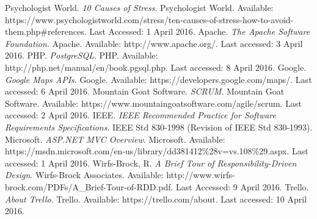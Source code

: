 \documentclass[10pt,twocolumn]{witseiepaper}
\begin{document}
\begin{thebibliography}{1}
	 Psychologist World. \textit{10 Causes of Stress}. Psychologist World. Available: https://www.psychologistworld.com/stress/ten-causes-of-stress-how-to-avoid-them.php\#references. Last Accessed: 1 April 2016. 
	 Apache. \textit{The Apache Software Foundation}. Apache. Available: http://www.apache.org/. Last accessed: 3 April 2016.
	 PHP. \textit{PostgreSQL}. PHP. Available: http://php.net/manual/en/book.pgsql.php. Last accessed: 8 April 2016.
	 Google. \textit{Google Maps APIs}. Google. Available: https://developers.google.com/maps/. Last accessed: 6 April 2016.
	 Mountain Goat Software. \textit{SCRUM}. Mountain Goat Software. Available: https://www.mountaingoatsoftware.com/agile/scrum. Last accessed: 2 April 2016.
	 IEEE. \textit{IEEE Recommended Practice for Software Requirements Specifications}. IEEE Std 830-1998 (Revision of IEEE Std 830-1993).
	 Microsoft. \textit{ASP.NET MVC Overview}. Microsoft. Available: https://msdn.microsoft.com/en-us/library/dd381412\%28v=vs.108\%29.aspx. Last accessed: 1 April 2016.
	 Wirfs-Brock, R. \textit{A Brief Tour of Responsibility-Driven Design}. Wirfs-Brock Associates. Available: http://www.wirfs-brock.com/PDFs/A\_Brief-Tour-of-RDD.pdf. Last Accessed: 9 April 2016.
	 Trello. \textit{About Trello}. Trello. Available: https://trello.com/about. Last accessed: 10 April 2016.
\end{thebibliography}	
\end{document}
